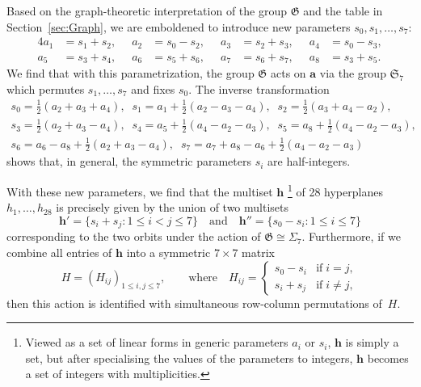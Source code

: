 \documentclass[12pt,reqno]{amsart}
\theoremstyle{remark}
\newcommand\ba{\boldsymbol a}
\newcommand\bh{\boldsymbol h}
\newcommand\frG{\mathfrak G}
\newcommand\frS{\mathfrak S}
\begin{document}
Based on the graph-theoretic interpretation of the group $\frG$ and the table in Section~\ref{sec:Graph}, we are emboldened to introduce new parameters $s_0, s_1,\ldots, s_7$:
\begin{alignat*}{4}
a_1 &= s_1+s_2 , &\;\;  a_2 &= s_0-s_2 , &\;\;  a_3 &= s_2+s_3 , &\;\; a_4 &= s_0-s_3 ,
\\
a_5 &= s_3+s_4 , &\;\;  a_6 &= s_5+s_6 , &\;\; a_7 &= s_6+s_7 , &\;\; a_8 &= s_3+s_5 .
\end{alignat*}
We find that with this parametrization, the group $\frG$ acts on $\ba$ via the group $\frS_7$ which permutes $s_1,\dots, s_7$ and fixes $s_0$. %
The inverse transformation
\begin{gather*}
s_0 = \tfrac12(a_2+a_3+a_4) , \;\;  s_1 = a_1+\tfrac12(a_2-a_3-a_4) , \;\;  s_2 = \tfrac12(a_3+a_4-a_2), \\
s_3 = \tfrac12(a_2+a_3 -a_4) , \;\;  s_4 = a_5+\tfrac12(a_4-a_2-a_3) , \;\; s_5 = a_8+\tfrac12(a_4-a_2-a_3) , \\
s_6 = a_6-a_8+\tfrac12(a_2+a_3-a_4) , \;\; s_7 = a_7+a_8-a_6+\tfrac12(a_4-a_2-a_3)
\end{gather*}
shows that, in general, the symmetric parameters  $s_i$ are half-integers. 

With these new parameters, we find that the multiset $\bh$%
\footnote{Viewed as a set of  linear forms in generic parameters $a_i$ or $s_i$, $\bh$ is simply a set, but after specialising the values of the parameters to integers, $\bh$ becomes a set of integers with multiplicities.}
of 28 hyperplanes $h_{1}, \allowbreak\dots,\allowbreak h_{28}$ is precisely given by the union of two multisets
\[ 
\bh'=\{s_i+s_j:1\leq i<j \leq 7\} \quad\text{and}\quad \bh''=\{s_0-s_i:1\leq i \leq 7\}
\]
corresponding to the two orbits under the action of $\frG\cong \Sigma_7$.
Furthermore, if we combine all entries of $\bh$ into a symmetric $7\times7$ matrix
\begin{equation} 
H=(H_{ij})_{1\le i,j\le 7},
\qquad\text{where}\quad
H_{ij}=\begin{cases}
s_0-s_i &\text{if}\; i=j, \\[2.5pt]
s_i+s_j &\text{if}\; i\ne j,
\end{cases}
\label{H-matr}
\end{equation}
then this action is identified with simultaneous row-column permutations of~$H$.
\end{document}
